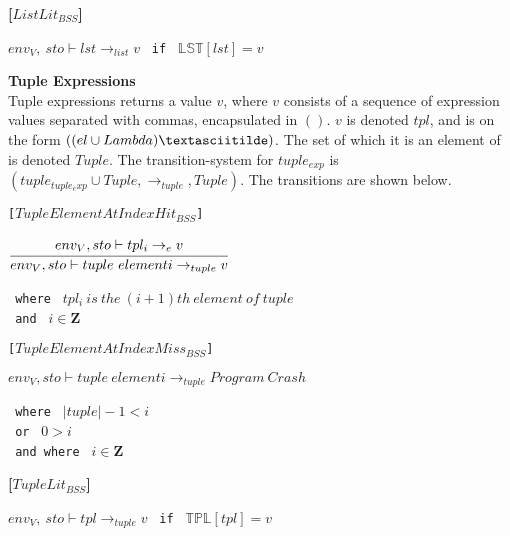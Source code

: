 \textbf{[$ListLit_{BSS}$]}
\begin{center}
	\begin{math}
	env_V,\ sto \vdash lst \rightarrow_{list} v
	\end{math}
	\texttt{ if } $\mathbb{LST}[lst] = v$
\end{center}

\textbf{\Large{Tuple Expressions}}\\
Tuple expressions returns a value $v$, where $v$ consists of a sequence of expression values separated with commas, encapsulated in $()$.
$v$ is denoted $tpl$, and is on the form $((el \cup Lambda)\textasciitilde)$.
The set of which it is an element of is denoted $Tuple$.
The transition-system for $tuple_{exp}$ is $(tuple_{tuple_exp} \cup Tuple, \rightarrow_{tuple}, Tuple)$.
The transitions are shown below.

\texttt{[$TupleElementAtIndexHit_{BSS}$]}
\begin{center}
	\begin{math}
	\cfrac
	{env_V, sto \vdash tpl_i \rightarrow_e v}
	{env_V, sto \vdash tuple\ element i \rightarrow_{tuple} v}
	\end{math}
	
	\texttt{ where } $tpl_i\ is\ the\ (i + 1)th\ element\ of\ tuple$\\
	\texttt{ and } $i \in \mathbf{Z}$
\end{center}

\texttt{[$TupleElementAtIndexMiss_{BSS}$]}
\begin{center}
	\begin{math}
	{env_V, sto \vdash tuple\ element i \rightarrow_{tuple} Program\ Crash}
	\end{math}
	
	\texttt{ where } $|tuple| - 1 < i$\\
	\texttt{ or } $0 > i$\\
	\texttt{ and where } $i \in \mathbf{Z}$
\end{center}

\textbf{[$TupleLit_{BSS}$]}\\
\begin{center}
	\begin{math}
	env_V,\ sto \vdash tpl \rightarrow_{tuple} v
	\end{math}
	\texttt{ if } $\mathbb{TPL}[tpl] = v$
\end{center}

